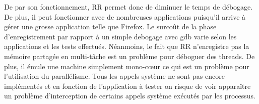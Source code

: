De par son fonctionnement, RR permet donc de diminuer le temps de débogage. De
plus, il peut fonctionner avec de nombreuses applications puisqu'il arrive à
gérer une grosse application telle que Firefox. Le surcoût de la phase
d'enregistrement par rapport à un simple debogage avec gdb varie selon les
applications et les tests effectués. Néanmoins, le fait que RR n'enregistre pas
la mémoire partagée en multi-tâche est un problème pour déboguer des threads. De
plus, il émule une machine simplement mono-c\oe ur ce qui est un problème pour
l'utilisation du parallélisme. Tous les appels système ne sont pas encore
implémentés et en fonction de l'application à tester on risque de voir
apparaître un problème d'interception de certains appels système exécutés par
les processus.
